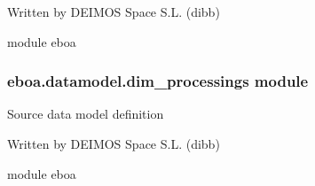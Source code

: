 Written by DEIMOS Space S.L. (dibb)

module eboa


\subsubsection{eboa.datamodel.dim\_processings module}
\label{\detokenize{eboa.datamodel:module-eboa.datamodel.sources}}\label{\detokenize{eboa.datamodel:eboa-datamodel-dim-processings-module}}
Source data model definition

Written by DEIMOS Space S.L. (dibb)

module eboa

